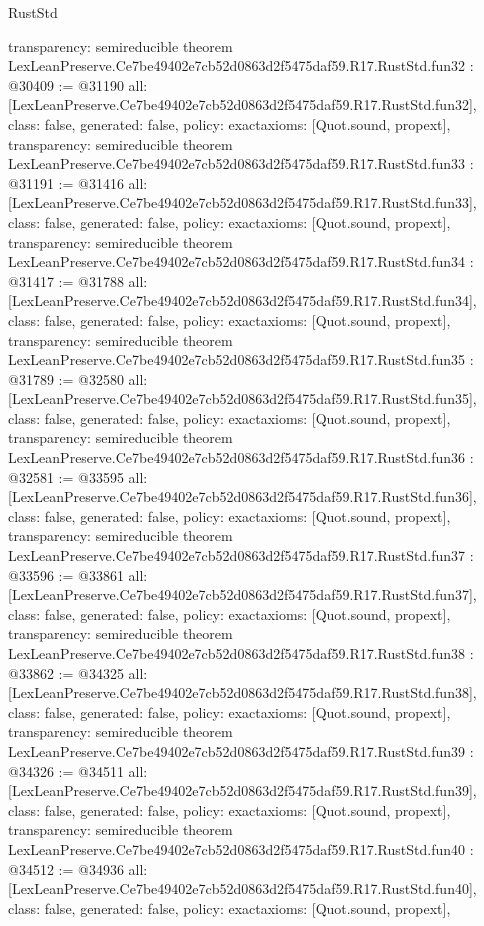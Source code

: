 \begin{lexlean}{RustStd}
\begin{coremodule}
{  transparency: semireducible
}
theorem LexLeanPreserve.Ce7be49402e7cb52d0863d2f5475daf59.R17.RustStd.fun32 : @30409 := @31190 {
  all: [LexLeanPreserve.Ce7be49402e7cb52d0863d2f5475daf59.R17.RustStd.fun32],
  class: false,
  generated: false,
  policy: exact{axioms: [Quot.sound, propext]},
  transparency: semireducible
}
theorem LexLeanPreserve.Ce7be49402e7cb52d0863d2f5475daf59.R17.RustStd.fun33 : @31191 := @31416 {
  all: [LexLeanPreserve.Ce7be49402e7cb52d0863d2f5475daf59.R17.RustStd.fun33],
  class: false,
  generated: false,
  policy: exact{axioms: [Quot.sound, propext]},
  transparency: semireducible
}
theorem LexLeanPreserve.Ce7be49402e7cb52d0863d2f5475daf59.R17.RustStd.fun34 : @31417 := @31788 {
  all: [LexLeanPreserve.Ce7be49402e7cb52d0863d2f5475daf59.R17.RustStd.fun34],
  class: false,
  generated: false,
  policy: exact{axioms: [Quot.sound, propext]},
  transparency: semireducible
}
theorem LexLeanPreserve.Ce7be49402e7cb52d0863d2f5475daf59.R17.RustStd.fun35 : @31789 := @32580 {
  all: [LexLeanPreserve.Ce7be49402e7cb52d0863d2f5475daf59.R17.RustStd.fun35],
  class: false,
  generated: false,
  policy: exact{axioms: [Quot.sound, propext]},
  transparency: semireducible
}
theorem LexLeanPreserve.Ce7be49402e7cb52d0863d2f5475daf59.R17.RustStd.fun36 : @32581 := @33595 {
  all: [LexLeanPreserve.Ce7be49402e7cb52d0863d2f5475daf59.R17.RustStd.fun36],
  class: false,
  generated: false,
  policy: exact{axioms: [Quot.sound, propext]},
  transparency: semireducible
}
theorem LexLeanPreserve.Ce7be49402e7cb52d0863d2f5475daf59.R17.RustStd.fun37 : @33596 := @33861 {
  all: [LexLeanPreserve.Ce7be49402e7cb52d0863d2f5475daf59.R17.RustStd.fun37],
  class: false,
  generated: false,
  policy: exact{axioms: [Quot.sound, propext]},
  transparency: semireducible
}
theorem LexLeanPreserve.Ce7be49402e7cb52d0863d2f5475daf59.R17.RustStd.fun38 : @33862 := @34325 {
  all: [LexLeanPreserve.Ce7be49402e7cb52d0863d2f5475daf59.R17.RustStd.fun38],
  class: false,
  generated: false,
  policy: exact{axioms: [Quot.sound, propext]},
  transparency: semireducible
}
theorem LexLeanPreserve.Ce7be49402e7cb52d0863d2f5475daf59.R17.RustStd.fun39 : @34326 := @34511 {
  all: [LexLeanPreserve.Ce7be49402e7cb52d0863d2f5475daf59.R17.RustStd.fun39],
  class: false,
  generated: false,
  policy: exact{axioms: [Quot.sound, propext]},
  transparency: semireducible
}
theorem LexLeanPreserve.Ce7be49402e7cb52d0863d2f5475daf59.R17.RustStd.fun40 : @34512 := @34936 {
  all: [LexLeanPreserve.Ce7be49402e7cb52d0863d2f5475daf59.R17.RustStd.fun40],
  class: false,
  generated: false,
  policy: exact{axioms: [Quot.sound, propext]},
}
\end{coremodule}
\end{lexlean}
